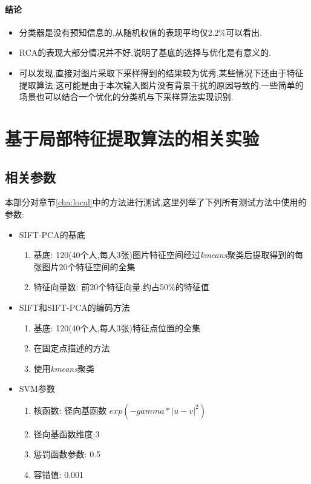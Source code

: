 \paragraph{结论}
\begin{itemize}
	\item 分类器是没有预知信息的,从随机权值的表现平均仅2.2\%可以看出.
	\item RCA的表现大部分情况并不好,说明了基底的选择与优化是有意义的.
	\item 可以发现,直接对图片采取下采样得到的结果较为优秀,某些情况下还由于特征提取算法.这可能是由于本次输入图片没有背景干扰的原因导致的.一些简单的场景也可以结合一个优化的分类机与下采样算法实现识别.
\end{itemize}
\section{基于局部特征提取算法的相关实验}
\label{sec:comp_local}

\subsection{相关参数}
本部分对章节\ref{cha:local}中的方法进行测试,这里列举了下列所有测试方法中使用的参数:

\begin{itemize}
	\item SIFT-PCA的基底 \begin{enumerate}
	\item 基底: 120(40个人,每人3张)图片特征空间经过\textit{kmeans}聚类后提取得到的每张图片20个特征空间的全集
	\item 特征向量数: 前20个特征向量,约占50\%的特征值
	\end{enumerate}
	
	\item SIFT和SIFT-PCA的编码方法 \begin{enumerate}
\item 基底: 120(40个人,每人3张)特征点位置的全集
	\item 在固定点描述的方法
	\item 使用\textit{kmeans}聚类	\end{enumerate}
	
	\item SVM参数 \begin{enumerate}
	\item 核函数: 径向基函数 $exp(-gamma*|u-v|^2)$
		\item 径向基函数维度:3
		\item 惩罚函数参数: 0.5
		\item 容错值: 0.001	\end{enumerate}
	
\end{itemize}




